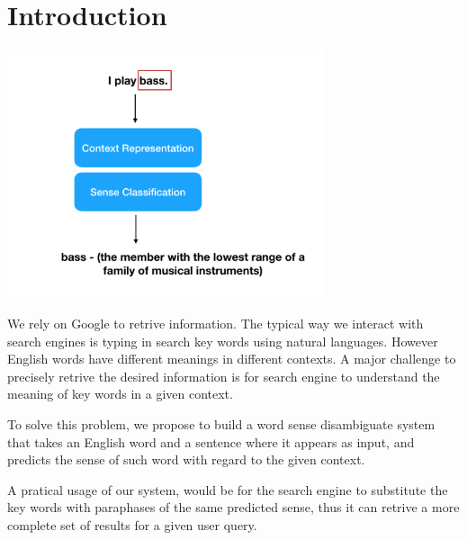 \section{Introduction}

\begin{center}
\includegraphics[width=0.7\textwidth]{graphs/overview.png}
\end{center}

We rely on Google to retrive information. The typical way we interact with
search engines is typing in search key words using natural languages. However
English words have different meanings in different contexts. A major challenge
to precisely retrive the desired information is for search engine to understand
the meaning of key words in a given context.

To solve this problem, we propose to build a word sense disambiguate system that
takes an English word and a sentence where it appears as input, and predicts the
sense of such word with regard to the given context. 

A pratical usage of our system, would be for the search engine to substitute the
key words with paraphases of the same predicted sense, thus it can retrive a
more complete set of results for a given user query.
